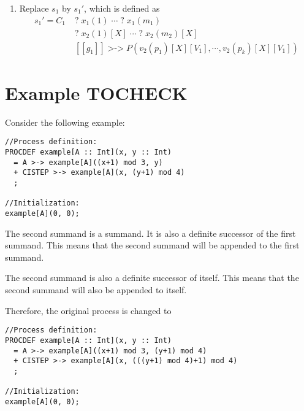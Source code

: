 \begin{enumerate}
\item Replace $s_1$ by ${s_1}'$, which is defined as
\begin{align*}
{s_1}' = C_1 \; &\texttt{?} \; x_1(1) \; \cdots{} \; \texttt{?} \; x_1(m_1) \\
&\texttt{?} \; x_2(1)[X] \; \cdots{} \; \texttt{?} \; x_2(m_2)[X] \\
&[[g_1]] \; \texttt{>->} \; P(v_2(p_1)[X][V_1], \cdots{}, v_2(p_k)[X][V_1])
\end{align*}

\end{enumerate}

\clearpage
\section{Example TOCHECK}

Consider the following example:

\begin{lstlisting}
//Process definition:
PROCDEF example[A :: Int](x, y :: Int)
  = A >-> example[A]((x+1) mod 3, y)
  + CISTEP >-> example[A](x, (y+1) mod 4)
  ;

//Initialization:
example[A](0, 0);
\end{lstlisting}

The second summand is a \cistep{} summand.
It is also a definite successor of the first summand.
This means that the second summand will be appended to the first summand.

The second summand is also a definite successor of itself.
This means that the second summand will also be appended to itself.

Therefore, the original process is changed to

\begin{lstlisting}
//Process definition:
PROCDEF example[A :: Int](x, y :: Int)
  = A >-> example[A]((x+1) mod 3, (y+1) mod 4)
  + CISTEP >-> example[A](x, (((y+1) mod 4)+1) mod 4)
  ;

//Initialization:
example[A](0, 0);
\end{lstlisting}


